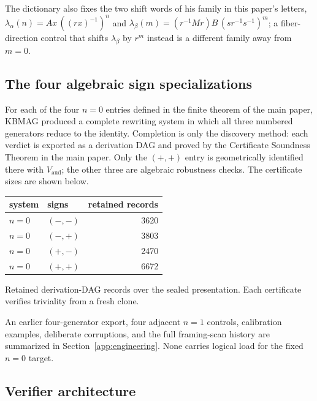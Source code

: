 \documentclass[11pt]{article}
\theoremstyle{definition}
\begin{document}
The dictionary also fixes the two shift words of his family in this
paper's letters, $\lambda_\alpha(n)=Ax\,((rx)^{-1})^n$ and
$\lambda_\beta(m)=(r^{-1}Mr)B\,(sr^{-1}s^{-1})^m$; a fiber-direction
control that shifts $\lambda_\beta$ by $r^{m}$ instead is a different family
away from $m=0$.

\subsection{The four algebraic sign specializations}

For each of the four $n=0$ entries defined in the finite theorem of the main
paper, KBMAG produced a complete rewriting system in which
all three numbered generators reduce to the identity.  Completion is only
the discovery method: each verdict is exported as a derivation DAG and
proved by the Certificate Soundness Theorem in the main paper.  Only the
$(+,+)$ entry is geometrically identified there with $V_{\mathrm{aud}}$; the
other three are algebraic robustness checks.  The certificate sizes are
shown below.

\begin{center}
\begin{tabular}{llr}
\toprule
system & signs & retained records\\
\midrule
$n{=}0$ & $(-,-)$ & 3620\\
$n{=}0$ & $(-,+)$ & 3803\\
$n{=}0$ & $(+,-)$ & 2470\\
$n{=}0$ & $(+,+)$ & 6672\\
\bottomrule
\end{tabular}

\smallskip
\small Retained derivation-DAG records over the sealed presentation.  Each
certificate verifies triviality from a fresh clone.
\end{center}

An earlier four-generator export, four adjacent $n=1$ controls, calibration
examples, deliberate corruptions, and the full framing-scan history are
summarized in Section~\ref{app:engineering}.  None carries logical load for
the fixed $n=0$ target.

\subsection{Verifier architecture}
\end{document}
